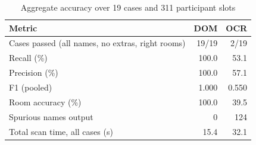 \begin{table}[t]
\caption{Aggregate accuracy over 19 cases and 311 participant slots}
\label{tab:aggregate}
\centering\footnotesize
\begin{tabular}{lrr}
\toprule
Metric & DOM & OCR \\
\midrule
Cases passed (all names, no extras, right rooms) & 19/19 & 2/19 \\
Recall (\%) & 100.0 & 53.1 \\
Precision (\%) & 100.0 & 57.1 \\
F1 (pooled) & 1.000 & 0.550 \\
Room accuracy (\%) & 100.0 & 39.5 \\
Spurious names output & 0 & 124 \\
Total scan time, all cases (s) & 15.4 & 32.1 \\
\bottomrule
\end{tabular}
\end{table}
